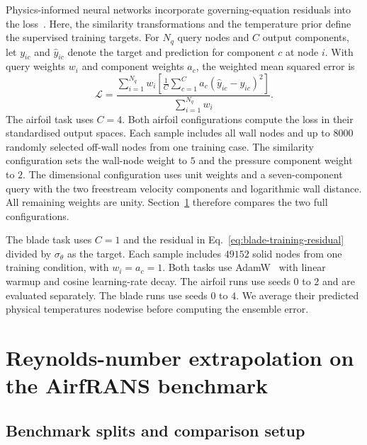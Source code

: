\documentclass[a4paper,fleqn]{cas-sc}
\begin{document}
Physics-informed neural networks incorporate governing-equation residuals into
the loss~\citep{Raissi2019}. Here, the similarity transformations and the temperature
prior define the supervised training targets. For $N_q$ query nodes and $C$ output components, let $y_{ic}$ and $\widehat y_{ic}$
denote the target and prediction for component $c$ at node $i$. With query weights
$w_i$ and component weights $a_c$, the weighted mean squared error is
\begin{equation}
  \label{eq:weighted-training-loss}
  \mathcal{L}=
  \frac{\displaystyle\sum_{i=1}^{N_q} w_i
    \left[\frac{1}{C}\sum_{c=1}^{C}a_c
      (\widehat y_{ic}-y_{ic})^2\right]}
       {\displaystyle\sum_{i=1}^{N_q}w_i}.
\end{equation}
The airfoil task uses $C=4$. Both airfoil configurations compute the loss in their
standardised output spaces. Each sample includes all wall nodes and up to $8000$
randomly selected off-wall nodes from one training case. The similarity configuration
sets the wall-node weight to $5$ and the pressure component weight to $2$. The
dimensional configuration uses unit weights and a seven-component query with the two
freestream velocity components and logarithmic wall distance. All remaining weights
are unity. Section~\ref{sec:airfrans-results} therefore compares the two full
configurations.

The blade task uses $C=1$ and the residual in Eq.~\eqref{eq:blade-training-residual}
divided by $\sigma_\theta$ as the target. Each sample includes $49152$ solid nodes from
one training condition, with $w_i=a_c=1$. Both tasks use AdamW~\citep{Loshchilov2019} with linear warmup and
cosine learning-rate decay. The airfoil runs use seeds $0$ to $2$ and are evaluated
separately. The blade runs use seeds $0$ to $4$. We average their predicted physical
temperatures nodewise before computing the ensemble error.

\section{Reynolds-number extrapolation on the AirfRANS benchmark}\label{sec:airfrans-results}
\par

\subsection{Benchmark splits and comparison setup}\label{subsec:airfrans-setup}
\par
\end{document}
